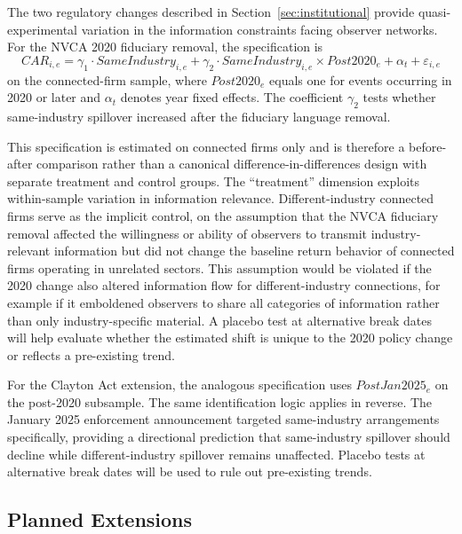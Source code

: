 The two regulatory changes described in Section~\ref{sec:institutional} provide quasi-experimental variation in the information constraints facing observer networks. For the NVCA 2020 fiduciary removal, the specification is
\begin{equation}
\label{eq:nvca}
CAR_{i,e} = \gamma_1 \cdot SameIndustry_{i,e} + \gamma_2 \cdot SameIndustry_{i,e} \times Post2020_e + \alpha_t + \varepsilon_{i,e}
\end{equation}
on the connected-firm sample, where $Post2020_e$ equals one for events occurring in 2020 or later and $\alpha_t$ denotes year fixed effects. The coefficient $\gamma_2$ tests whether same-industry spillover increased after the fiduciary language removal.

This specification is estimated on connected firms only and is therefore a before-after comparison rather than a canonical difference-in-differences design with separate treatment and control groups. The ``treatment'' dimension exploits within-sample variation in information relevance. Different-industry connected firms serve as the implicit control, on the assumption that the NVCA fiduciary removal affected the willingness or ability of observers to transmit industry-relevant information but did not change the baseline return behavior of connected firms operating in unrelated sectors. This assumption would be violated if the 2020 change also altered information flow for different-industry connections, for example if it emboldened observers to share all categories of information rather than only industry-specific material. A placebo test at alternative break dates will help evaluate whether the estimated shift is unique to the 2020 policy change or reflects a pre-existing trend.

For the Clayton Act extension, the analogous specification uses $PostJan2025_e$ on the post-2020 subsample. The same identification logic applies in reverse. The January 2025 enforcement announcement targeted same-industry arrangements specifically, providing a directional prediction that same-industry spillover should decline while different-industry spillover remains unaffected. Placebo tests at alternative break dates will be used to rule out pre-existing trends.

\subsection{Planned Extensions}



